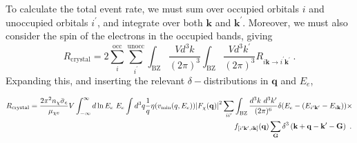 \documentclass[
    prd, twocolumn, superscriptaddress, nofootinbib, amsmath, amssymb,
    aps, floatfix,preprintnumbers
]{revtex4-2}
\begin{document}
        To calculate the total event rate, we must sum over occupied orbitals $i$ and unoccupied orbitals $i^\prime$, and integrate over both $\mathbf{k}$ and $\mathbf{k^\prime}$. Moreover, we must also consider the spin of the electrons in the occupied bands, giving
        \begin{equation}
            R_\mathrm{crystal} = 2\sum_i^\mathrm{occ}\sum_{i^\prime}^\mathrm{unocc}\int_\mathrm{BZ}\frac{Vd^3k}{(2\pi)^3}\int_\mathrm{BZ}\frac{Vd^3k^\prime}{(2\pi)^3}R_{i\mathbf{k}\rightarrow i^\prime \mathbf{k^\prime}}\ .
        \end{equation}
        Expanding this, and inserting the relevant $\delta-$distributions in $\mathbf{q}$ and $E_e$,
        \begin{widetext}
            \begin{equation}
                \begin{split}
                    R_\mathrm{crystal} = \frac{2\pi^2n_\chi\Bar{\sigma}_e}{\mu_{\chi e}}V\int_{-\infty}^\infty d\ln E_e\ E_e\int d^3q \frac{1}{q} \eta(v_\mathrm{min}(q, E_e))\abs{F_\chi(\mathbf{q})}^2\sum_{ii^\prime}&\int_\mathrm{BZ}\frac{d^3k\ d^3k^\prime}{(2\pi)^6}\delta(E_e - (E_{i^\prime\mathbf{k^\prime}} - E_{i\mathbf{k}}))\times\\
                    &f_{\left[i^\prime\mathbf{k}^\prime,i\mathbf{k}\right]}(\mathbf{q}) \sum_{\mathbf{G}} \delta^3\left(\mathbf{k + q - k^\prime - G}\right)\ .
                \end{split}
            \end{equation}
        \end{widetext}
        
\end{document}
